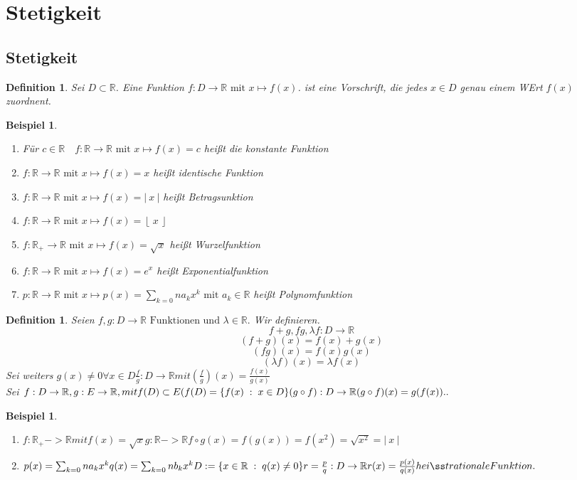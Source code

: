 \documentclass[a4paper,titlepage,oneside]{article}
\def\R{\ensuremath{\mathbb{R}} }
\def\sp{\hspace{0,1cm}}
\newcommand{\abs}[1]{\ensuremath{\left|\:#1\:\right|}}
\newcommand{\floor}[1]{\ensuremath{\left\lfloor\:#1\:\right\rfloor}}
\newcommand{\menge}[2]{\ensuremath{\{#1\sp : \sp #2\}}}
\theoremstyle{thmstyle}
\newtheorem{defi}[satz]{Definition}
\newtheorem{bsp}[satz]{Beispiel}
\begin{document}
\newpage
\section{Stetigkeit}
\subsection{Stetigkeit}
\begin{defi}
Sei $ D \subset \R$. Eine Funktion $f : D \to \R \text{ mit } x \mapsto f(x) $. ist eine Vorschrift, die jedes $ x \in D$ genau einem WErt $f(x)$ zuordnent.
\end{defi}

\begin{bsp}
\begin{enumerate}
\item Für $ c \in \R \quad f : \R \to \R \text{ mit } x \mapsto f(x) = c $ heißt die konstante Funktion %
\item $f : \R \to \R \text{ mit } x \mapsto f(x) = x $ heißt identische Funktion %
\item $f : \R \to \R \text{ mit } x \mapsto f(x) = \abs{x} $ heißt Betragsunktion %
\item $f : \R \to \R \text{ mit } x \mapsto f(x) = \floor{x} $ %
\item $f : \R_+ \to \R \text{ mit } x \mapsto f(x) = \sqrt{x} $ heißt Wurzelfunktion %
\item $f : \R \to \R \text{ mit } x \mapsto f(x) = e^x $ heißt Exponentialfunktion %
\item $p : \R \to \R \text{ mit } x \mapsto p(x) = \sum_{k=0}{n}{a_kx^k} \text{ mit } a_k \in \R $ heißt Polynomfunktion %
\end{enumerate}
\end{bsp}

\begin{defi}
Seien $f,g : D \to \R \text{ Funktionen und } \lambda \in \R.$ Wir definieren.
\[f+ g, f  g, \lambda f : D \to \R \]
\[(f+g)(x) = f(x) + g(x)\]
\[(fg)(x) = f(x) g(x)\]
\[(\lambda f)(x) = \lambda f(x) \]
Sei weiters $g(x) \ne 0 \forall x \in D
\frac{f}{g} : D \to \R mit \left(\frac{f}{g}\right)(x) = \frac{f(x)}{g(x)} $\\
Sei $ f: D \to \R, g: E \to \R, mit f(D) \subset E (f(D) = \menge{f(x)}{x \in D}
(g  \circ  f)  :  D \to \R
(g  \circ  f)(x) = g(f(x)) ..$
\end{defi}

\begin{bsp}
\begin{enumerate}
\item $f: \R_+ -> \R mit f(x) = \sqrt{x}
 g: \R -> \R
 f \circ g(x) = f(g(x)) = f(x^2) = \sqrt{x^2} = \abs{x}$
\item $
 p(x) = \sum_{k=0}{n}{a_kx^k}
 q(x) = \sum_{k=0}{n}{b_kx^k}
 D:= \menge{x\in \R}{q(x) \ne 0}
 r = \frac{p}{q} : D \to \R
 r(x) = \frac{p(x)}{q(x)} heißt rationale Funktion.$
\end{enumerate}
\end{bsp}
\end{document}
